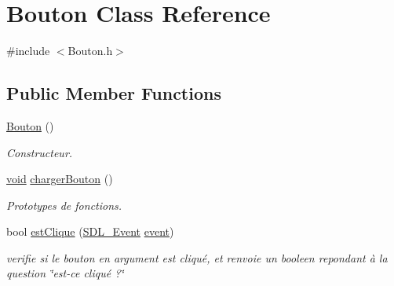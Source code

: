 \hypertarget{class_bouton}{}\section{Bouton Class Reference}
\label{class_bouton}


{\ttfamily \#include $<$Bouton.\+h$>$}

\subsection*{Public Member Functions}
\begin{DoxyCompactItemize}
\item 
\hyperlink{class_bouton_ad1e4f684cad81db47393df0be7a65658}{Bouton} ()
\begin{DoxyCompactList}\small\item\em Constructeur. \end{DoxyCompactList}\item 
\hyperlink{_s_d_l__opengl_8h_a3db05964a3cc4410f35b7ea2b7eb850d}{void} \hyperlink{class_bouton_ad380f12cb79e60662f7b48fb8b1a3f88}{charger\+Bouton} ()
\begin{DoxyCompactList}\small\item\em Prototypes de fonctions. \end{DoxyCompactList}\item 
bool \hyperlink{class_bouton_a6607b52390ab4363317a78acbb2142ea}{est\+Clique} (\hyperlink{union_s_d_l___event}{S\+D\+L\+\_\+\+Event} \hyperlink{class_bouton_a499f5c9de8eea03c8194eb3ecf4b7c00}{event})
\begin{DoxyCompactList}\small\item\em verifie si le bouton en argument est cliqué, et renvoie un booleen repondant à la question \char`\"{}est-\/ce cliqué ?\char`\"{} \end{DoxyCompactList}\end{DoxyCompactItemize}

